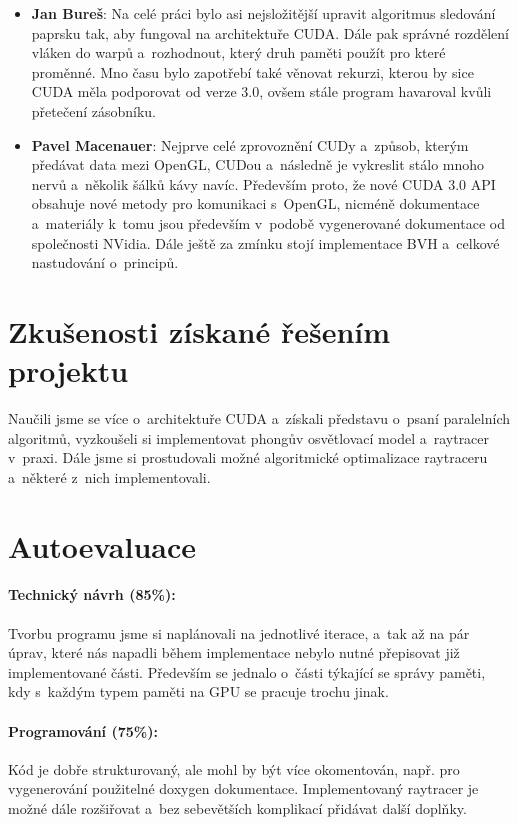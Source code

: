 \documentclass[12pt,a4paper,titlepage,final]{report}
\begin{document}
\begin{itemize}
\item \textbf{Jan Bureš}: Na celé práci bylo asi nejsložitější upravit algoritmus sledování paprsku tak, aby fungoval na architektuře CUDA. Dále pak správné rozdělení vláken do warpů a~rozhodnout, který druh paměti použít pro které proměnné. Mno času bylo zapotřebí také věnovat rekurzi, kterou by sice CUDA měla podporovat od verze 3.0, ovšem stále program havaroval kvůli přetečení zásobníku.
\item \textbf{Pavel Macenauer}: Nejprve celé zprovoznění CUDy a~způsob, kterým předávat data mezi OpenGL, CUDou a~následně je vykreslit stálo mnoho nervů a~několik šálků kávy navíc. Především proto, že nové CUDA 3.0 API obsahuje nové metody pro komunikaci s~OpenGL, nicméně dokumentace a~materiály k~tomu jsou především v~podobě vygenerované dokumentace od společnosti NVidia. Dále ještě za zmínku stojí implementace BVH a~celkové nastudování o~principů.
\end{itemize}
\section{Zkušenosti získané řešením projektu}

Naučili jsme se více o~architektuře CUDA a~získali představu o~psaní paralelních algoritmů, vyzkoušeli si implementovat phongův osvětlovací model a~raytracer v~praxi. Dále jsme si prostudovali možné algoritmické optimalizace raytraceru a~některé z~nich implementovali.


\section{Autoevaluace}

\paragraph{Technický návrh (85\%):} 
Tvorbu programu jsme si naplánovali na jednotlivé iterace, a~tak až na pár úprav, které nás napadli během implementace nebylo nutné přepisovat již implementované části. Především se jednalo o~části týkající se správy paměti, kdy s~každým typem paměti na GPU se pracuje trochu jinak.

\paragraph{Programování (75\%):}
Kód je dobře strukturovaný, ale mohl by být více okomentován, např. pro vygenerování použitelné doxygen dokumentace. 
Implementovaný raytracer je možné dále rozšiřovat a~bez sebevětších komplikací přidávat další doplňky.
\end{document}
